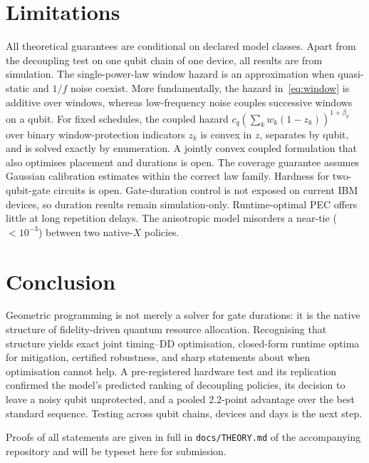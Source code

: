 \documentclass[10pt,journal]{IEEEtran}
\theoremstyle{remark}
\begin{document}
\section{Limitations}\label{sec:limits}
All theoretical guarantees are conditional on declared model classes. Apart from the decoupling test on one
qubit chain of one device, all results are from simulation. The single-power-law
window hazard is an approximation when quasi-static and $1/f$ noise coexist. More fundamentally, the hazard
in~\eqref{eq:window} is additive over windows, whereas low-frequency noise couples successive windows on a
qubit. For fixed schedules, the coupled hazard $c_q(\sum_k w_k(1-z_k))^{1+\beta_q}$ over binary
window-protection indicators $z_k$ is convex in $z$, separates by qubit, and is solved exactly by enumeration.
A jointly convex coupled formulation that also optimises placement and durations is open. The coverage guarantee assumes
Gaussian calibration estimates within the correct law family. Hardness for two-qubit-gate circuits is open.
Gate-duration control is not exposed on current IBM devices, so duration results remain simulation-only.
Runtime-optimal PEC offers little at long repetition delays. The anisotropic model misorders a near-tie
($<10^{-3}$) between two native-$X$ policies.

\section{Conclusion}
Geometric programming is not merely a solver for gate durations: it is the native structure of
fidelity-driven quantum resource allocation. Recognising that structure yields exact joint timing--DD
optimisation, closed-form runtime optima for mitigation, certified robustness, and sharp statements about when
optimisation cannot help. A pre-registered hardware test and its replication confirmed the model's predicted ranking
of decoupling policies, its decision to leave a noisy qubit unprotected, and a pooled 2.2-point advantage over
the best standard sequence. Testing across qubit chains, devices and days is the next step.

\appendix[Proofs]
Proofs of all statements are given in full in \texttt{docs/THEORY.md} of the accompanying repository and will be
typeset here for submission.
\end{document}
